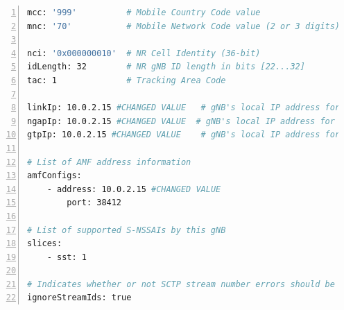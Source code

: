 \begin{lstlisting}[basicstyle=\small, frame=single, breaklines=true, postbreak=\mbox{\textcolor{red}{$\hookrightarrow$}\space}, escapeinside ={\%,}, escapechar={!}, numbers=left, language=sh, caption=gnb configuratie]
mcc: '999'          # Mobile Country Code value
mnc: '70'           # Mobile Network Code value (2 or 3 digits)

nci: '0x000000010'  # NR Cell Identity (36-bit)
idLength: 32        # NR gNB ID length in bits [22...32]
tac: 1              # Tracking Area Code

linkIp: 10.0.2.15 #CHANGED VALUE   # gNB's local IP address for Radio Link Simulation (Usually same with local IP)
ngapIp: 10.0.2.15 #CHANGED VALUE  # gNB's local IP address for N2 Interface (Usually same with local IP)
gtpIp: 10.0.2.15 #CHANGED VALUE    # gNB's local IP address for N3 Interface (Usually same with local IP)

# List of AMF address information
amfConfigs:
    - address: 10.0.2.15 #CHANGED VALUE
        port: 38412

# List of supported S-NSSAIs by this gNB
slices:
    - sst: 1

# Indicates whether or not SCTP stream number errors should be ignored.
ignoreStreamIds: true
\end{lstlisting}

\subsection{}%
\label{sec:ue_config}%

